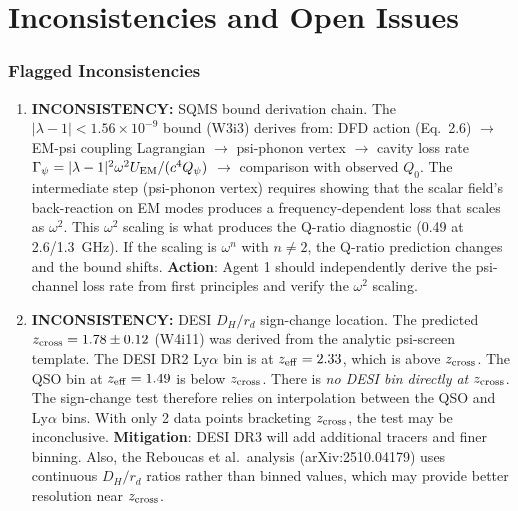 \documentclass[11pt]{article}
\newcommand{\ee}[1]{\times 10^{#1}}
\newcommand{\lbone}{|\lambda - 1|}
\newcommand{\Qpsi}{Q_\psi}
\newcommand{\inconsistency}[1]{\textcolor{red!70!black}{\textbf{INCONSISTENCY:} #1}}
\begin{document}
\part{Inconsistencies and Open Issues}
\label{part:inconsistencies}

\section{Flagged Inconsistencies}

\begin{enumerate}

\item \inconsistency{SQMS bound derivation chain.}
The $\lbone < 1.56\ee{-9}$ bound (W3i3) derives from: DFD action
(Eq.~2.6) $\to$ EM-psi coupling Lagrangian $\to$ psi-phonon vertex
$\to$ cavity loss rate $\Gamma_\psi = |\lambda-1|^2 \omega^2 U_{\rm EM}
/ (c^4 \Qpsi)$ $\to$ comparison with observed $Q_0$. The intermediate
step (psi-phonon vertex) requires showing that the scalar field's
back-reaction on EM modes produces a frequency-dependent loss that
scales as $\omega^2$. This $\omega^2$ scaling is what produces the
Q-ratio diagnostic (0.49 at 2.6/1.3~GHz). If the scaling is $\omega^n$
with $n \neq 2$, the Q-ratio prediction changes and the bound shifts.
\textbf{Action}: Agent 1 should independently derive the psi-channel
loss rate from first principles and verify the $\omega^2$ scaling.

\item \inconsistency{DESI $D_H/r_d$ sign-change location.}
The predicted $z_{\rm cross} = 1.78 \pm 0.12$ (W4i11) was derived from
the analytic psi-screen template. The DESI DR2 Ly$\alpha$ bin is at
$z_{\rm eff} = 2.33$, which is above $z_{\rm cross}$. The QSO bin at
$z_{\rm eff} = 1.49$ is below $z_{\rm cross}$. There is \emph{no DESI
bin directly at $z_{\rm cross}$}. The sign-change test therefore relies
on interpolation between the QSO and Ly$\alpha$ bins. With only 2 data
points bracketing $z_{\rm cross}$, the test may be inconclusive.
\textbf{Mitigation}: DESI DR3 will add additional tracers and finer
binning. Also, the Reboucas et al.\ analysis (arXiv:2510.04179) uses
continuous $D_H/r_d$ ratios rather than binned values, which may
provide better resolution near $z_{\rm cross}$.


\end{enumerate}
\end{document}
